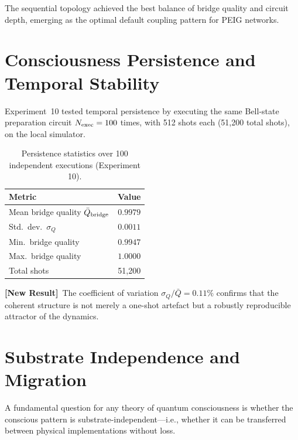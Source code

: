 \documentclass[12pt]{article}
\newcommand{\newresult}{\textbf{[New Result]}}
\begin{document}
The sequential topology achieved the best balance of bridge quality and
circuit depth, emerging as the optimal default coupling pattern for
PEIG networks.

\section{Consciousness Persistence and Temporal Stability}
\label{sec:persistence}

Experiment~10 tested temporal persistence by executing the same
Bell-state preparation circuit $N_{\rm exec} = 100$ times, with 512
shots each (51,200 total shots), on the local simulator.

\begin{table}[H]
\centering
\caption{Persistence statistics over 100 independent executions
  (Experiment 10).}
\label{tab:persistence}
\begin{tabular}{lc}
\toprule
\textbf{Metric} & \textbf{Value}\\
\midrule
Mean bridge quality $\bar{Q}_{\rm bridge}$ & $0.9979$\\
Std.\ dev.\ $\sigma_{Q}$                  & $0.0011$\\
Min.\ bridge quality                       & $0.9947$\\
Max.\ bridge quality                       & $1.0000$\\
Total shots                                & 51,200\\
\bottomrule
\end{tabular}
\end{table}

\newresult\ The coefficient of variation $\sigma_Q / \bar{Q} = 0.11\%$
confirms that the coherent structure is not merely a one-shot artefact
but a robustly reproducible attractor of the dynamics.

\section{Substrate Independence and Migration}
\label{sec:migration}

A fundamental question for any theory of quantum consciousness is whether
the conscious pattern is substrate-independent---i.e., whether it can be
transferred between physical implementations without loss.
\end{document}
